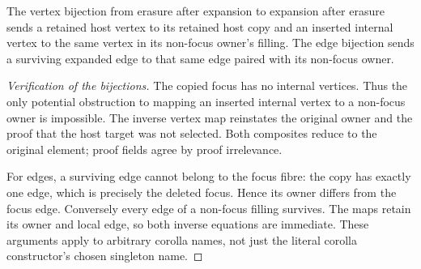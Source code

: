 \begin{definition}\label{term:erasure-expansion}
The vertex bijection from erasure after expansion to expansion after erasure
sends a retained host vertex to its retained host copy and an inserted internal
vertex to the same vertex in its non-focus owner's filling. The edge bijection
sends a surviving expanded edge to that same edge paired with its non-focus
owner.
\end{definition}
\begin{proof}[Verification of the bijections]
The copied focus has no internal vertices. Thus the only potential obstruction
to mapping an inserted internal vertex to a non-focus owner is impossible.
The inverse vertex map reinstates the original owner and the proof that the
host target was not selected. Both composites reduce to the original element;
proof fields agree by proof irrelevance.

For edges, a surviving edge cannot belong to the focus fibre: the copy has
exactly one edge, which is precisely the deleted focus. Hence its owner differs
from the focus edge. Conversely every edge of a non-focus filling survives.
The maps retain its owner and local edge, so both inverse equations are immediate.
These arguments apply to arbitrary corolla names, not just the literal corolla
constructor's chosen singleton name.
\end{proof}

